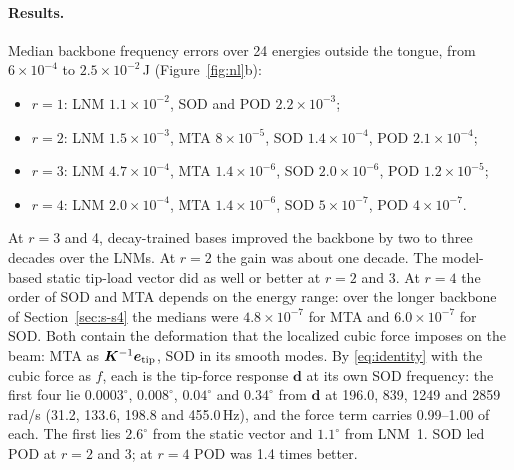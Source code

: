 \documentclass[preprint,12pt]{elsarticle}
\begin{document}
\paragraph{Results.} Median backbone frequency errors over 24 energies outside the tongue, from $6\times10^{-4}$ to $2.5\times10^{-2}$\,J (Figure~\ref{fig:nl}b):
\begin{itemize}
\item $r=1$: LNM $1.1\times10^{-2}$, SOD and POD $2.2\times10^{-3}$;
\item $r=2$: LNM $1.5\times10^{-3}$, MTA $8\times10^{-5}$, SOD $1.4\times10^{-4}$, POD $2.1\times10^{-4}$;
\item $r=3$: LNM $4.7\times10^{-4}$, MTA $1.4\times10^{-6}$, SOD $2.0\times10^{-6}$, POD $1.2\times10^{-5}$;
\item $r=4$: LNM $2.0\times10^{-4}$, MTA $1.4\times10^{-6}$, SOD $5\times10^{-7}$, POD $4\times10^{-7}$.
\end{itemize}
At $r=3$ and 4, decay-trained bases improved the backbone by two to three decades over the LNMs. At $r=2$ the gain was about one decade. The model-based static tip-load vector did as well or better at $r=2$ and 3. At $r=4$ the order of SOD and MTA depends on the energy range: over the longer backbone of Section~\ref{sec:s-s4} the medians were $4.8\times10^{-7}$ for MTA and $6.0\times10^{-7}$ for SOD.
Both contain the deformation that the localized cubic force imposes on the beam: MTA as $\bm{K}^{-1}\bm{e}_{\mathrm{tip}}$, SOD in its smooth modes. By \eqref{eq:identity} with the cubic force as $f$, each is the tip-force response $\bm{d}$ at its own SOD frequency: the first four lie $0.0003^\circ$, $0.008^\circ$, $0.04^\circ$ and $0.34^\circ$ from $\bm{d}$ at 196.0, 839, 1249 and 2859\,rad/s (31.2, 133.6, 198.8 and 455.0\,Hz), and the force term carries 0.99--1.00 of each. The first lies $2.6^\circ$ from the static vector and $1.1^\circ$ from LNM~1.
SOD led POD at $r=2$ and 3; at $r=4$ POD was 1.4 times better.
\end{document}
